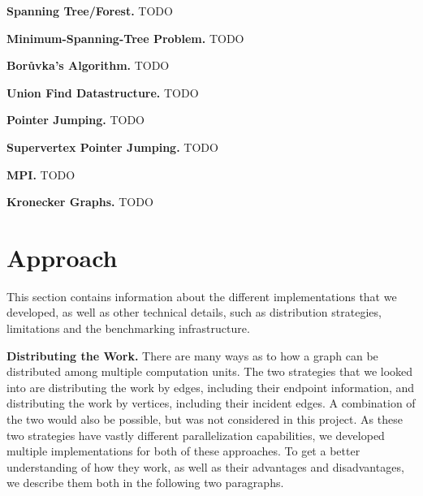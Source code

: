 \documentclass[letterpaper]{article}
\newcommand{\mypar}[1]{{\bf #1.}}
\begin{document}
\mypar{Spanning Tree/Forest}
TODO

\mypar{Minimum-Spanning-Tree Problem}
TODO

\mypar{Bor\r{u}vka's Algorithm}
TODO

\mypar{Union Find Datastructure}
TODO

\mypar{Pointer Jumping}
TODO

\mypar{Supervertex Pointer Jumping}
TODO

\mypar{MPI}
TODO

\mypar{Kronecker Graphs}
TODO \cite{leskovec2010kronecker}

%
%
%


\section{Approach}
\label{sec:approach}
This section contains information about the different implementations that we developed, as well as other technical
details, such as distribution strategies, limitations and the benchmarking infrastructure.

\mypar{Distributing the Work}
There are many ways as to how a graph can be distributed among multiple computation units. The two strategies that we
looked into are distributing the work by edges, including their endpoint information, and distributing the work by
vertices, including their incident edges. A combination of the two would also be possible, but was not considered in
this project. As these two strategies have vastly different parallelization capabilities, we developed multiple
implementations for both of these approaches. To get a better understanding of how they work, as well as their
advantages and disadvantages, we describe them both in the following two paragraphs.
\end{document}
